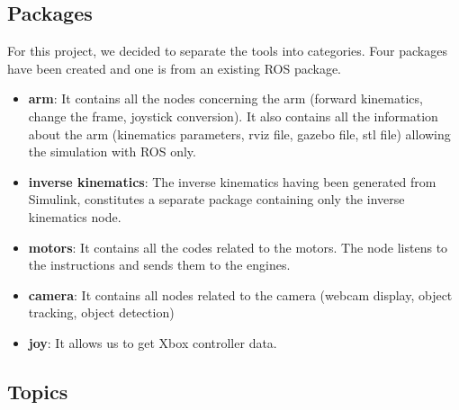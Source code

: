 \subsection{Packages}
For this project, we decided to separate the tools into categories. Four packages have been created and one is from an existing ROS package.
\begin{itemize}
    \item \textbf{arm}: It contains all the nodes concerning the arm (forward kinematics, change the frame, joystick conversion). It also contains all the information about the arm (kinematics parameters, rviz file, gazebo file, stl file) allowing the simulation with ROS only.
    \item \textbf{inverse kinematics}: The inverse kinematics having been generated from Simulink, constitutes a separate package containing only the inverse kinematics node.
    \item  \textbf{motors}: It contains all the codes related to the motors. The node listens to the instructions and sends them to the engines.
    \item  \textbf{camera}: It contains all nodes related to the camera (webcam display, object tracking, object detection)
    \item  \textbf{joy}: It allows us to get Xbox controller data.
\end{itemize}

\subsection{Topics}

